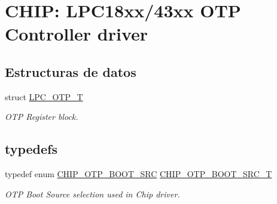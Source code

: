 \hypertarget{group___o_t_p__18_x_x__43_x_x}{}\section{C\+H\+IP\+: L\+P\+C18xx/43xx O\+TP Controller driver}
\label{group___o_t_p__18_x_x__43_x_x}
\subsection*{Estructuras de datos}
\begin{DoxyCompactItemize}
\item 
struct \hyperlink{struct_l_p_c___o_t_p___t}{L\+P\+C\+\_\+\+O\+T\+P\+\_\+T}
\begin{DoxyCompactList}\small\item\em O\+TP Register block. \end{DoxyCompactList}\end{DoxyCompactItemize}
\subsection*{\textquotesingle{}typedefs\textquotesingle{}}
\begin{DoxyCompactItemize}
\item 
typedef enum \hyperlink{group___o_t_p__18_x_x__43_x_x_ga6e90c3dfad51a2a8591e531b0a788134}{C\+H\+I\+P\+\_\+\+O\+T\+P\+\_\+\+B\+O\+O\+T\+\_\+\+S\+RC} \hyperlink{group___o_t_p__18_x_x__43_x_x_gada36d39d34c8821f0416a852faa926f6}{C\+H\+I\+P\+\_\+\+O\+T\+P\+\_\+\+B\+O\+O\+T\+\_\+\+S\+R\+C\+\_\+T}
\begin{DoxyCompactList}\small\item\em O\+TP Boot Source selection used in Chip driver. \end{DoxyCompactList}\end{DoxyCompactItemize}
